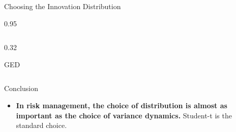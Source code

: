 \documentclass[9pt, aspectratio=169, t]{beamer}
\begin{document}
\begin{frame}{Choosing the Innovation Distribution}
\begin{cminipage}{0.95\textwidth}
\begin{columns}[T]
\begin{column}{0.32\textwidth}
\begin{block}{\centering GED}
\begin{itemize}
                    \end{itemize}
                \end{block}
            \end{column}
        \end{columns}
        \vspace{0.2cm}
        \begin{alertblock}{Conclusion}
            \begin{itemize}\setlength{\itemsep}{0pt}
                \item \textbf{In risk management, the choice of distribution is almost as important as the choice of variance dynamics.} Student-t is the standard choice.
            \end{itemize}
        \end{alertblock}
    \end{cminipage}
\end{frame}
\end{document}
